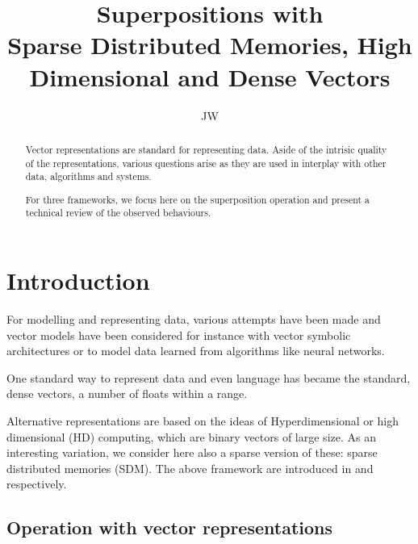 \documentclass[11pt]{article}
\title{\textbf{Superpositions with  \\ Sparse Distributed Memories, High Dimensional and Dense Vectors}} %
\author{JW}
\date{}
\begin{document}
\maketitle
\begin{abstract}
Vector representations are standard for representing data.
Aside of the intrisic quality of the representations, various questions 
arise as they are used in interplay with other data,
algorithms and systems.


For three frameworks, 
we focus here on the superposition operation and present a technical review of the observed behaviours. 





\end{abstract}

\section{Introduction}
For modelling and representing data, various attempts have been made
and vector models have been considered for instance with
 vector symbolic architectures or to model data learned from algorithms like neural networks.


One standard way to represent data and even language has became
the standard, dense vectors, a number of floats within a range.

Alternative representations are based on the ideas of Hyperdimensional or high dimensional (HD) computing, which are binary vectors of large size. As an interesting variation, we consider here also a sparse version of these: sparse distributed memories (SDM).
The above framework are introduced in \cite{kanerva1} 
and  \cite{kanerva2} respectively.



\subsection{Operation with vector representations}
\end{document}
